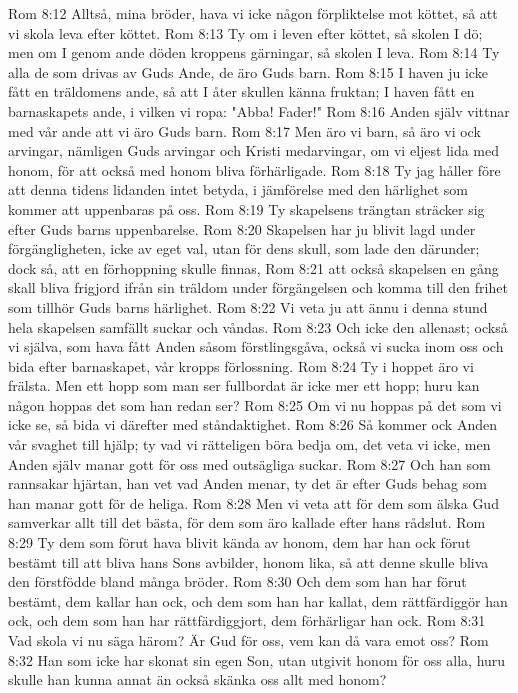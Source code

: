 Rom 8:12  Alltså, mina bröder, hava vi icke någon förpliktelse mot köttet, så att vi skola leva efter köttet.
Rom 8:13  Ty om i leven efter köttet, så skolen I dö; men om I genom ande döden kroppens gärningar, så skolen I leva.
Rom 8:14  Ty alla de som drivas av Guds Ande, de äro Guds barn.
Rom 8:15  I haven ju icke fått en träldomens ande, så att I åter skullen känna fruktan; I haven fått en barnaskapets ande, i vilken vi ropa: "Abba! Fader!"
Rom 8:16  Anden själv vittnar med vår ande att vi äro Guds barn.
Rom 8:17  Men äro vi barn, så äro vi ock arvingar, nämligen Guds arvingar och Kristi medarvingar, om vi eljest lida med honom, för att också med honom bliva förhärligade.
Rom 8:18  Ty jag håller före att denna tidens lidanden intet betyda, i jämförelse med den härlighet som kommer att uppenbaras på oss.
Rom 8:19  Ty skapelsens trängtan sträcker sig efter Guds barns uppenbarelse.
Rom 8:20  Skapelsen har ju blivit lagd under förgängligheten, icke av eget val, utan för dens skull, som lade den därunder; dock så, att en förhoppning skulle finnas,
Rom 8:21  att också skapelsen en gång skall bliva frigjord ifrån sin träldom under förgängelsen och komma till den frihet som tillhör Guds barns härlighet.
Rom 8:22  Vi veta ju att ännu i denna stund hela skapelsen samfällt suckar och våndas.
Rom 8:23  Och icke den allenast; också vi själva, som hava fått Anden såsom förstlingsgåva, också vi sucka inom oss och bida efter barnaskapet, vår kropps förlossning.
Rom 8:24  Ty i hoppet äro vi frälsta. Men ett hopp som man ser fullbordat är icke mer ett hopp; huru kan någon hoppas det som han redan ser?
Rom 8:25  Om vi nu hoppas på det som vi icke se, så bida vi därefter med ståndaktighet.
Rom 8:26  Så kommer ock Anden vår svaghet till hjälp; ty vad vi rätteligen böra bedja om, det veta vi icke, men Anden själv manar gott för oss med outsägliga suckar.
Rom 8:27  Och han som rannsakar hjärtan, han vet vad Anden menar, ty det är efter Guds behag som han manar gott för de heliga.
Rom 8:28  Men vi veta att för dem som älska Gud samverkar allt till det bästa, för dem som äro kallade efter hans rådslut.
Rom 8:29  Ty dem som förut hava blivit kända av honom, dem har han ock förut bestämt till att bliva hans Sons avbilder, honom lika, så att denne skulle bliva den förstfödde bland många bröder.
Rom 8:30  Och dem som han har förut bestämt, dem kallar han ock, och dem som han har kallat, dem rättfärdiggör han ock, och dem som han har rättfärdiggjort, dem förhärligar han ock.
Rom 8:31  Vad skola vi nu säga härom? Är Gud för oss, vem kan då vara emot oss?
Rom 8:32  Han som icke har skonat sin egen Son, utan utgivit honom för oss alla, huru skulle han kunna annat än också skänka oss allt med honom?
